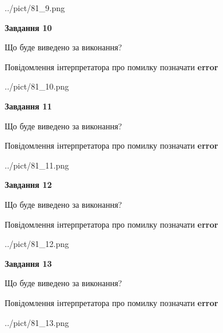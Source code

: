\documentclass[11pt, ukrainian]{article}
\begin{document}
{\begin {large}
\begin{center}
	{../pict/81_9.png}
\end{center}
\newpage

{\begin {center}\textbf{Завдання 10}\end {center}}\par
Що буде виведено за виконання? \par
Повідомлення інтерпретатора про помилку позначати \textbf{error}

\begin{center}
	{../pict/81_10.png}
\end{center}
\newpage

{\begin {center}\textbf{Завдання 11}\end {center}}\par
Що буде виведено за виконання? \par
Повідомлення інтерпретатора про помилку позначати \textbf{error}

\begin{center}
	{../pict/81_11.png}
\end{center}
\newpage

{\begin {center}\textbf{Завдання 12}\end {center}}\par
Що буде виведено за виконання? \par
Повідомлення інтерпретатора про помилку позначати \textbf{error}

\begin{center}
	{../pict/81_12.png}
\end{center}
\newpage

{\begin {center}\textbf{Завдання 13}\end {center}}\par
Що буде виведено за виконання? \par
Повідомлення інтерпретатора про помилку позначати \textbf{error}

\begin{center}
	{../pict/81_13.png}
\end{center}
\newpage


\end{large}}
\end{document}
